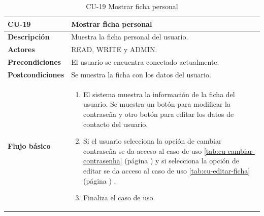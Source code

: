 \begin{table} [H]
    \centering
    \setlength{\leftmargini}{0.4cm}
	\resizebox{15cm}{!} { %
    \begin{tabular}{| m{3cm} | m{12cm} |}   
    \hline
	  \textbf{CU-19} & \textbf{Mostrar ficha personal} \\\hline
	  \textbf{Descripción} & Muestra la ficha personal del usuario. \\\hline
	  \textbf{Actores} & READ, WRITE y ADMIN. \\\hline
	  \textbf{Precondiciones} & El usuario se encuentra conectado actualmente. \\\hline
	  \textbf{Postcondiciones} & Se muestra la ficha con los datos del usuario. \\\hline
	  \textbf{Flujo básico} & 
		\begin{enumerate}
	  	\item El sistema muestra la información de la ficha del usuario. Se muestra un botón para modificar la contraseña y otro botón para editar los datos de contacto del usuario.
		\item Si el usuario selecciona la opción de cambiar contraseña se da acceso al caso de uso \ref{tab:cu-cambiar-contrasenha} (página \pageref{tab:cu-cambiar-contrasenha}) y si selecciona la opción de editar se da acceso al caso de uso \ref{tab:cu-editar-ficha} (página \pageref{tab:cu-editar-ficha}) .	  
	   	\item Finaliza el caso de uso.
	  \end{enumerate} 	  	  
	  \\\hline
    \end{tabular}
    } %
    \caption{CU-19 Mostrar ficha personal}
    \label{tab:cu-mostrar-ficha}
\end{table}



